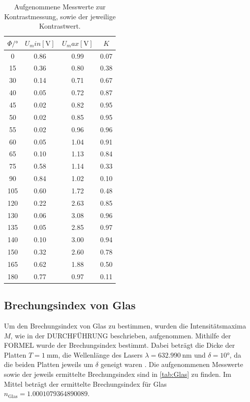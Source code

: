 \begin{table}
  \centering
  \caption{Aufgenommene Messwerte zur Kontrastmessung, sowie der jeweilige Kontrastwert.}
  \label{tab:Kontrast}
  \begin{tabular}{c c c c}
    \toprule
    $\Phi / ° $ & $U_min [\si{\volt}]$ & $U_max [\si{\volt}]$ & $K$ \\
    \midrule
    0     &  0.86  &  0.99  & 0.07  \\
    15    &  0.36  &  0.80  & 0.38  \\
    30    &  0.14  &  0.71  & 0.67  \\
    40    &  0.05  &  0.72  & 0.87  \\
    45    &  0.02  &  0.82  & 0.95  \\
    50    &  0.02  &  0.85  & 0.95  \\
    55    &  0.02  &  0.96  & 0.96  \\
    60    &  0.05  &  1.04  & 0.91  \\
    65    &  0.10  &  1.13  & 0.84  \\
    75    &  0.58  &  1.14  & 0.33  \\
    90    &  0.84  &  1.02  & 0.10  \\
    105   &  0.60  &  1.72  & 0.48  \\
    120   &  0.22  &  2.63  & 0.85  \\
    130   &  0.06  &  3.08  & 0.96  \\
    135   &  0.05  &  2.85  & 0.97  \\
    140   &  0.10  &  3.00  & 0.94  \\
    150   &  0.32  &  2.60  & 0.78  \\
    165   &  0.62  &  1.88  & 0.50  \\
    180   &  0.77  &  0.97  & 0.11  \\
    \bottomrule
  \end{tabular}
\end{table}

\subsection{Brechungsindex von Glas}
\label{subsec:n_Glas}
Um den Brechungsindex von Glas zu bestimmen, wurden die Intensitätsmaxima $M$, wie in der DURCHFÜHRUNG beschrieben, aufgenommen.
Mithilfe der FORMEL wurde der Brechungsindex bestimmt.
Dabei beträgt die Dicke der Platten $T = \SI{1}{\milli\metre}$, die Wellenlänge des Lasers $\lambda = \SI{632.990}{\nano\metre}$ und $\delta = 10°$, da die beiden Platten jeweils um $\delta$ geneigt waren \cite{anleitung}.
Die aufgenommenen Messwerte sowie der jeweils ermittelte Brechungsindex sind in \ref{tab:Glas} zu finden.
Im Mittel beträgt der ermittelte Brechungsindex für Glas $n_\text{Glas} = 1.0001079364890089$.


